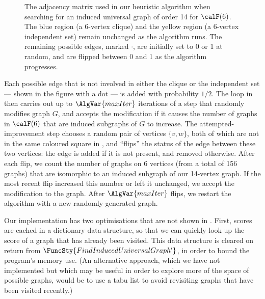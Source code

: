 \begin{figure}[h!]
    \centering
    \footnotesize
    \caption{The adjacency matrix used in our heuristic algorithm when searching
        for an induced universal graph of order 14 for $\calF(6)$.  The blue
        region (a 6-vertex clique) and the yellow region (a 6-vertex independent
        set) remain unchanged as the algorithm runs.  The remaining possible edges,
        marked $\boldsymbol{\cdot}$, are initially set to 0 or 1 at random,
        and are flipped between 0 and 1 as the algorithm progresses.}
\label{fig:heuristic-regions}
\end{figure}

Each possible edge that is not involved in either the clique or the independent
set --- shown in the figure with a dot --- is added with probability $1/2$.
The loop in  then carries out up to
$\AlgVar{maxIter}$ iterations of a step that randomly modifies graph $G$,
and accepts the modification if it causes the number of graphs in $\calF(6)$ that
are induced subgraphs of $G$ to increase.
The attempted-improvement step chooses a random pair of vertices $\{v, w\}$,
both of which are not in the same coloured square
in , and
``flips'' the status of the edge between these two vertices: the edge is added if it
is not present, and removed otherwise.
After each flip, we count the number of graphs on 6 vertices (from a total
of 156 graphs) that are
isomorphic to an induced subgraph of our 14-vertex graph.  If the most recent flip
increased this number or left it unchanged, we accept the modification
to the graph.  After $\AlgVar{maxIter}$
flips, we restart the algorithm with a new randomly-generated graph.

Our implementation has two optimisations that are not shown in .
First, scores are cached in a dictionary data structure, so that we can quickly look
up the score of a graph that has already been visited. This data structure is
cleared on return from $\FuncSty{FindInducedUniversalGraph'}$, in order to
bound the program's memory use.
(An alternative approach, which we have not implemented but which
may be useful in order to explore more of the space of possible graphs, would be to
use a tabu list \cite{DBLP:books/daglib/0093574} to avoid revisiting graphs
that have been visited recently.)

